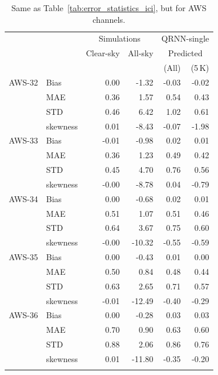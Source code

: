\documentclass[amt, manuscript]{copernicus}
\begin{document}
\begin{table}[t]
	\caption{Same as Table~\ref{tab:error_statistics_ici}, but for AWS channels. }
	\label{tab:statistics_qrnn_aws}
	\begin{tabular}{llrr|rr}
		\tophline
		&&\multicolumn{2}{c|}{Simulations}& \multicolumn{2}{c}{QRNN-single} \\
		\cline{3-6}
		&&Clear-sky &   All-sky &  \multicolumn{2}{c}{Predicted}  \\
		&&   &    &   (All) & (5\,K) \\
		\middlehline
		AWS-32  &Bias      & 0.00 & -1.32 &  -0.03 & -0.02 \\
		&MAE      & 0.36 &  1.57 &   0.54 &  0.43 \\
		&STD      & 0.46 &  6.42 &   1.02 &  0.61 \\
		&skewness & 0.01 & -8.43 &  -0.07 & -1.98 \\
		\middlehline
		AWS-33	&Bias      & -0.01 & -0.98 &  0.02 &  0.01 \\
		&MAE      &  0.36 &  1.23 &  0.49 &  0.42 \\
		&STD      &  0.45 &  4.70 &  0.76 &  0.56 \\
		&skewness & -0.00 & -8.78 &  0.04 & -0.79 \\
		
		\middlehline
		AWS-34	&Bias      &  0.00 &  -0.68 &  0.02 &  0.01 \\
		&MAE      &  0.51 &   1.07 &  0.51 &  0.46 \\
		&STD      &  0.64 &   3.67 &  0.75 &  0.60 \\
		&skewness & -0.00 & -10.32 & -0.55 & -0.59 \\
		\middlehline
		AWS-35	&Bias      &  0.00 &  -0.43 &  0.01 &  0.00 \\
		&MAE      &  0.50 &   0.84 &  0.48 &  0.44 \\
		&STD      &  0.63 &   2.65 &  0.71 &  0.57 \\
		&skewness & -0.01 & -12.49 & -0.40 & -0.29 \\
		\middlehline
		AWS-36  &Bias      & 0.00 &  -0.28 &   0.03  &  0.03 \\
		&MAE       & 0.70 &   0.90 &   0.63  &  0.60 \\
		&STD      & 0.88 &   2.06 &   0.86  &  0.76 \\
		&skewness & 0.01 & -11.80 &  -0.35  & -0.20 \\
		\bottomhline				
	\end{tabular}
	\belowtable{} %
\end{table}
\end{document}
